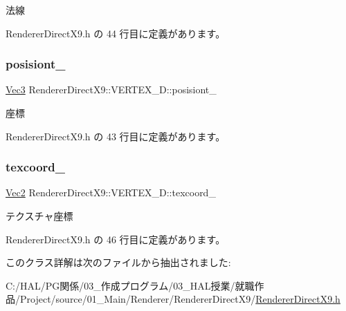 法線 



 Renderer\+Direct\+X9.\+h の 44 行目に定義があります。

\mbox{\label{class_renderer_direct_x9_1_1_v_e_r_t_e_x__3_d_a15e30709ae06aa5bc8e73054e9f160e9}} 
\subsubsection{\texorpdfstring{posisiont\+\_\+}{posisiont\_}}
{\footnotesize\ttfamily \mbox{\hyperlink{_vector3_d_8h_ab16f59e4393f29a01ec8b9bbbabbe65d}{Vec3}} Renderer\+Direct\+X9\+::\+V\+E\+R\+T\+E\+X\+\_\+D\+::posisiont\+\_\+}



座標 



 Renderer\+Direct\+X9.\+h の 43 行目に定義があります。

\mbox{\label{class_renderer_direct_x9_1_1_v_e_r_t_e_x__3_d_a240251febb14de7b0a6525d3b305f516}} 
\subsubsection{\texorpdfstring{texcoord\+\_\+}{texcoord\_}}
{\footnotesize\ttfamily \mbox{\hyperlink{_vector3_d_8h_a5ef6e95dfc5f9d3820b71772d99bbc25}{Vec2}} Renderer\+Direct\+X9\+::\+V\+E\+R\+T\+E\+X\+\_\+D\+::texcoord\+\_\+}



テクスチャ座標 



 Renderer\+Direct\+X9.\+h の 46 行目に定義があります。



このクラス詳解は次のファイルから抽出されました\+:\begin{DoxyCompactItemize}
\item 
C\+:/\+H\+A\+L/\+P\+G関係/03\+\_\+作成プログラム/03\+\_\+\+H\+A\+L授業/就職作品/\+Project/source/01\+\_\+\+Main/\+Renderer/\+Renderer\+Direct\+X9/\mbox{\hyperlink{_renderer_direct_x9_8h}{Renderer\+Direct\+X9.\+h}}\end{DoxyCompactItemize}
